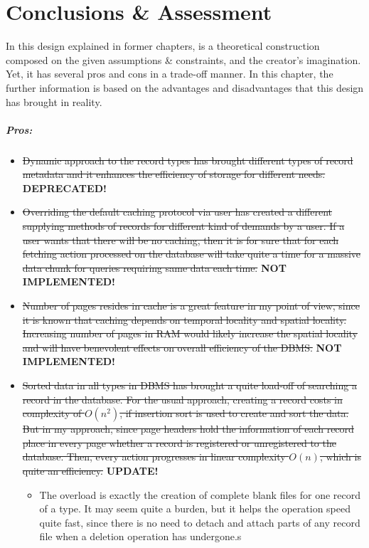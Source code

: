 \documentclass[12pt]{report}
\begin{document}
\chapter{Conclusions \& Assessment}

In this design explained in former chapters, is a theoretical construction composed on the given assumptions \& constraints, and the creator's imagination. Yet, it has several pros and cons in a trade-off manner. In this chapter, the further information is based on the advantages and disadvantages that this design has brought in reality. \\
\paragraph{Pros:}
\begin{itemize}
\item \sout{Dynamic approach to the record types has brought different types of record metadata and it enhances the efficiency of storage for different needs. }\textbf{DEPRECATED!}
\item \sout{Overriding the default caching protocol via user has created a different supplying methods of records for different kind of demands by a user. If a user wants that there will be no caching, then it is for sure that for each fetching action processed on the database will take quite a time for a massive data chunk for queries requiring same data each time. }\textbf{NOT IMPLEMENTED!}
\item \sout{Number of pages resides in cache is a great feature in my point of view, since it is known that caching depends on temporal locality and spatial locality. Increasing number of pages in RAM would likely increase the spatial locality and will have benevolent effects on overall efficiency of the DBMS. }\textbf{NOT IMPLEMENTED!}

\newpage

\item \sout{Sorted data in all types in DBMS has brought a quite load-off of searching a record in the database. For the usual approach, creating a record costs in complexity of $O(n^2)$, if insertion sort is used to create and sort the data. But in my approach, since page headers hold the information of each record place in every page whether a record is registered or unregistered to the database. Then, every action progresses in linear complexity $O(n)$, which is quite an efficiency.} \textbf{UPDATE!} \\

\begin{itemize}
    \item The overload is exactly the creation of complete blank files for one record of a type. It may seem quite a burden, but it helps the operation speed quite fast, since there is no need to detach and attach parts of any record file when a deletion operation has undergone.s 
\end{itemize}
\end{itemize}
\end{document}
